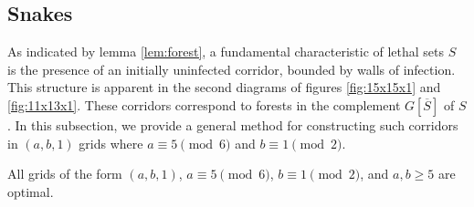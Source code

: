 \subsection{Snakes}

As indicated by lemma \ref{lem:forest}, a fundamental characteristic of lethal sets $S$ is the presence of an initially uninfected corridor, bounded by walls of infection. This structure is apparent in the second diagrams of figures \ref{fig:15x15x1} and \ref{fig:11x13x1}. These corridors correspond to forests in the complement $G[\overline{S}]$ of $S$. In this subsection, we provide a general method for constructing such corridors in $(a, b, 1)$ grids where $a \equiv 5 \pmod 6$ and $b \equiv 1 \pmod 2$.

\begin{con}
\label{con:snake}
All grids of the form $(a,b,1)$, $a \equiv 5 \pmod 6$, $b \equiv 1 \pmod 2$, and $a,b \geq 5$ are optimal.
\end{con}

